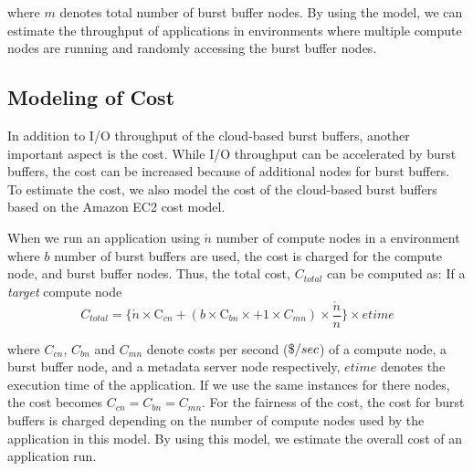 where $m$ denotes total number of burst buffer nodes. 
By using the model, we can estimate the throughput of applications in
environments where multiple compute nodes are running and randomly accessing the
burst buffer nodes.


\subsection{Modeling of Cost}
\label{ssec:cost_model}
In addition to I/O throughput of the cloud-based burst buffers, another
important aspect is the cost.
While I/O throughput can be accelerated by burst buffers, the cost can be
increased because of additional nodes for burst buffers.
To estimate the cost, we also model the cost of the cloud-based burst buffers
based on the Amazon EC2 cost model.

When we run an application using $\acute{n}$ number of compute nodes in a
environment where $b$ number of burst buffers are used, the cost is charged for
the compute node, and burst buffer nodes.
Thus, the total cost, $C_{total}$ can be computed as:   If a \emph{target}
compute node
\begin{equation}
C_{total} = \{　\acute{n} \times \text{C}_{cn}+ (b \times \text{C}_{bn} \times
+ 1 \times C_{mn}) \times \frac{\acute{n}}{n} \}\times etime
\end{equation}

where $C_{cn}$, $C_{bn}$ and $C_{mn}$ denote costs per second (${\it \$} /sec$)
of a compute node, a burst buffer node, and a metadata server node
respectively, $etime$ denotes the execution time of the application. If we
use the same instances for there nodes, the cost becomes
$C_{cn}=C_{bn}=C_{mn}$.
For the fairness of the cost, the cost for burst buffers is charged depending on the number of compute nodes used by the application in this model. By using this
model, we estimate the overall cost of an application run.


